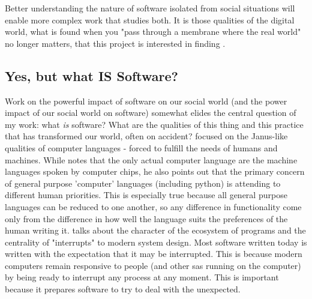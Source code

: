 \documentclass[a4paper,man,natbib,floatsintext]{apa6}
\begin{document}
  Better understanding the nature of software isolated from social situations will enable more complex work that studies both. It is those qualities of the digital world, what is found when you "pass through a membrane where the real world" no longer matters, that this project is interested in finding \citep[p. 3]{Ullman2012-fq}.

  \subsection{Yes, but what IS Software?}

  Work on the powerful impact of software on our social world (and the power impact of our social world on software) somewhat elides the central question of my work: what \textit{is} software? What are the qualities of this thing and this practice that has transformed our world, often on accident? \citet{Cramer2008-cw} focused on the Janus-like qualities of computer languages - forced to fulfill the needs of humans and machines. While \citet{Cramer2008-cw} notes that the only actual computer language are the machine languages spoken by computer chips, he also points out that the primary concern of general purpose 'computer' languages (including \gls{python}) is attending to different human priorities. This is especially true because all general purpose languages can be reduced to one another, so any difference in functionality come only from the difference in how well the language suits the preferences of the human writing it. \citet{Yuill2008-by} talks about the character of the ecosystem of programs and the centrality of "interrupts" to modern system design. Most software written today is written with the expectation that it may be interrupted. This is because modern computers remain responsive to people (and other \glspl{sa} running on the computer) by being ready to interrupt any process at any moment. This is important because it prepares software to try to deal with the unexpected.
\end{document}
